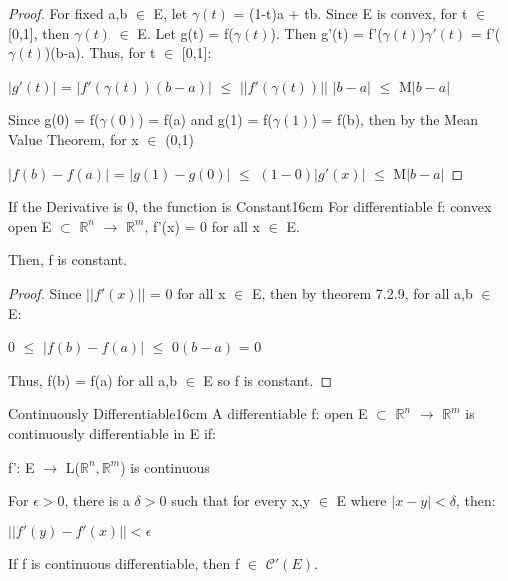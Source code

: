     \begin{proof}
        For fixed a,b $\in$ E, let $\gamma(t)$ = (1-t)a + tb.
        Since E is convex, for t $\in$ [0,1], then $\gamma(t)$ $\in$ E.
        Let g(t) = f($\gamma(t)$).
        Then g'(t) = f'($\gamma(t)$)$\gamma'(t)$
        = f'($\gamma(t)$)(b-a). Thus, for t $\in$ [0,1]:

        \hspace{0.5cm}
        $|g'(t)|$
        = $|f'(\gamma(t))(b-a)|$
        $\leq$ $||f'(\gamma(t))||$ $|b-a|$
        $\leq$ M$|b-a|$

        Since g(0) = f($\gamma(0)$) = f(a)
        and g(1) = f($\gamma(1)$) = f(b), then by the Mean Value Theorem,
        for x $\in$ (0,1)

        \hspace{0.5cm}
        $|f(b) - f(a)|$
        = $|g(1) - g(0)|$
        $\leq$ $(1-0) |g'(x)|$
        $\leq$ M$|b-a|$
    \end{proof}

    \vspace{0.5cm}



    \begin{corollary}{If the Derivative is 0, the function is Constant}{16cm}
        For differentiable f: convex open E $\subset$ $\mathbb{R}^n$
        $\rightarrow$ $\mathbb{R}^m$, f'(x) = 0 for all x $\in$ E.
        
        Then, f is constant.
    \end{corollary}

    \begin{proof}
        Since $||f'(x)||$ = 0 for all x $\in$ E,
        then by {\color{red} theorem 7.2.9}, for all a,b $\in$ E:
        
        \hspace{0.5cm}
        0 $\leq$ $|f(b) - f(a)|$ $\leq$ $0(b-a)$ = 0

        Thus, f(b) = f(a) for all a,b $\in$ E so f is constant.
    \end{proof}

    \vspace{0.5cm}



    \begin{definition}{Continuously Differentiable}{16cm}
        A differentiable f: open E $\subset$ $\mathbb{R}^n$
        $\rightarrow$ $\mathbb{R}^m$ is {\color{lblue} continuously differentiable}
        in E if:
        
        \hspace{0.5cm}
        f': E $\rightarrow$ L($\mathbb{R}^n,\mathbb{R}^m$) is continuous

        For $\epsilon > 0$, there is a $\delta > 0$ such that for
        every x,y $\in$ E where $|x-y| < \delta$, then:

        \hspace{0.5cm}
        $||f'(y) - f'(x)|| < \epsilon$

        If f is continuous differentiable, then f $\in$ $\mathscr{C}'(E)$.
    \end{definition}

